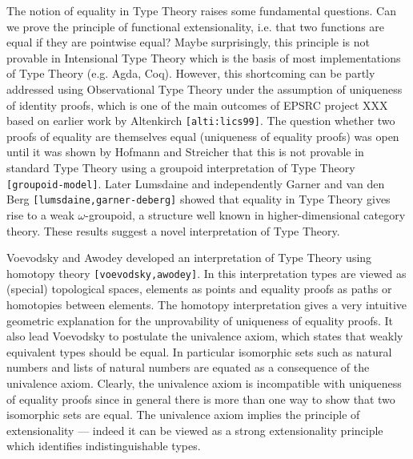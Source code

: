 \documentclass[a4paper]{article}
\renewcommand{\cite}[1]{{\tt[#1]}}
\begin{document}
The notion of equality in Type Theory raises some fundamental questions. 
Can we prove the principle of functional extensionality,
i.e. that two functions are equal if they are pointwise equal? Maybe
surprisingly, this principle is not provable in Intensional Type
Theory which is the basis of most implementations of Type Theory
(e.g. Agda, Coq). However, this shortcoming can be partly addressed
using Observational Type Theory under the assumption of uniqueness of
identity proofs, which is one of the main outcomes of EPSRC project
XXX based on earlier work by Altenkirch \cite{alti:lics99}.
The question whether two proofs of
equality are themselves equal (uniqueness of equality proofs) 
was open until it was shown by Hofmann and Streicher that this is not
provable in standard Type Theory using a groupoid interpretation of
Type Theory \cite{groupoid-model}. Later Lumsdaine and independently
Garner and van den Berg \cite{lumsdaine,garner-deberg} showed that
equality in Type Theory gives rise to a weak $\omega$-groupoid, a
structure well known in higher-dimensional category theory. These results
suggest a novel interpretation of Type Theory. 

Voevodsky and Awodey developed an interpretation of Type Theory using
homotopy theory \cite{voevodsky,awodey}. In this interpretation types
are viewed as (special) topological spaces, elements as points and
equality proofs as paths or homotopies between elements. The homotopy
interpretation gives a very intuitive geometric explanation for the
unprovability of uniqueness of equality proofs. It also lead Voevodsky
to postulate the univalence axiom, which states that weakly equivalent
types should be equal. In particular isomorphic sets such as natural
numbers and lists of natural numbers are equated as a consequence of
the univalence axiom. Clearly, the univalence axiom is incompatible
with uniqueness of equality proofs since in general there is more than
one way to show that two isomorphic sets are equal. The univalence
axiom implies the principle of extensionality --- indeed it can be viewed
as a strong extensionality principle which identifies
indistinguishable types.  
\end{document}
